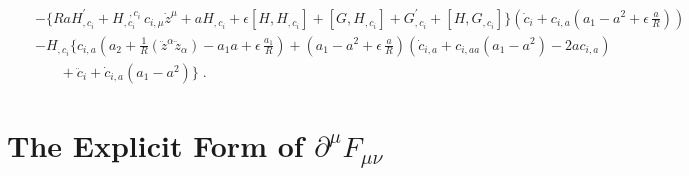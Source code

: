 \documentclass[a4paper,twocolumn,prd,showpacs,amsmath,amssymb]{revtex4}
\begin{document}
\begin{widetext}
\begin{eqnarray}
& & - \lbrace R a H^{\prime}_{,c_{i}} + H_{,c_{i}}^{\;\; ,c_{i}} \, c_{i,\mu} \dot{z}^{\mu}
+ a H_{,c_{i}} + \epsilon [H, H_{,c_{i}}] + [G,H_{,c_{i}}] + G^{\prime}_{,c_{i}}
+ [H,G_{,c_{i}}] \rbrace (\dot{c}_{i}
+ c_{i,a} (a_{1} - a^2 + \epsilon \, \frac{a}{R})) \nonumber \\
& & - H_{,c_{i}} \lbrace c_{i,a} (a_2 + \frac{1}{R} (\ddot{z}^{\alpha} \ddot{z}_{\alpha})
- a_1 a + \epsilon \, \frac{a_1}{R}) + (a_{1} - a^2 + \epsilon \, \frac{a}{R})
(\dot{c}_{i,a} + c_{i,aa} (a_1 - a^2) -2 a c_{i,a}) \nonumber \\
& & ~~~~~~~~ + \ddot{c}_{i} + \dot{c}_{i,a} (a_1 - a^2) \rbrace \; . \label{leq}
\end{eqnarray}
\end{widetext}

\section{\label{app2} The Explicit Form of $\partial^{\mu} F_{\mu\nu}$}
\end{document}
